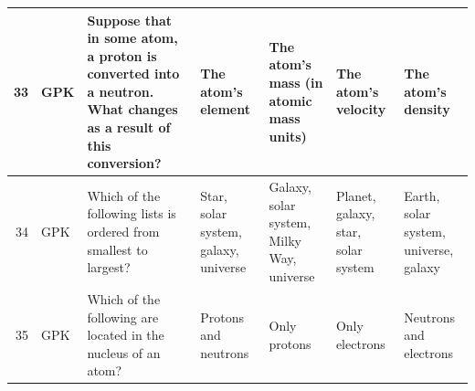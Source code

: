 \documentclass[10pt]{article}
\begin{document}
\begin{tiny}
\begin{longtable}{r|p{0.375in}|p{1.275in}|p{0.75in}|p{0.75in}|p{0.75in}|p{0.75in}}
    33    &      GPK &                                                                                                                                                                    Suppose that in some atom, a proton is converted into a neutron. What changes as a result of this conversion? &                                                                                                                    The atom's element &                                                                The atom's mass (in atomic mass units) &                                                                                                        The atom's velocity &                                                                                                                The atom's density \\\hline
    34    &      GPK &                                                                                                                                                                                                                Which of the following lists is ordered from smallest to largest? &                                                                                                  Star, solar system, galaxy, universe &                                                             Galaxy, solar system, Milky Way, universe &                                                                                         Planet, galaxy, star, solar system &                                                                                             Earth, solar system, universe, galaxy \\\hline
    35    &      GPK &                                                                                                                                                                                                                    Which of the following are located in the nucleus of an atom? &                                                                                                                  Protons and neutrons &                                                                                          Only protons &                                                                                                             Only electrons &                                                                                                            Neutrons and electrons \\\hline

\end{longtable}
\end{tiny}
\end{document}
